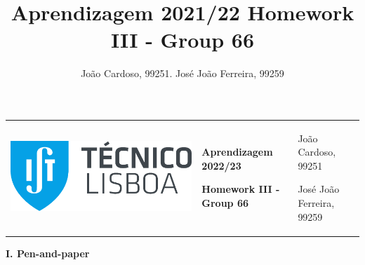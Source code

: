 \documentclass[11pt,a4paper]{article}
\title{Aprendizagem 2021/22 Homework III - Group 66}
\author{João Cardoso, 99251. José João Ferreira, 99259}
\begin{document}
\color{darkgray}
\hspace{-8.25mm}
\renewcommand\tabularxcolumn[1]{m{#1}}
\begin{tabularx}{1.09\textwidth} {>{\raggedright\arraybackslash}X >{\centering\arraybackslash}X >{\raggedleft\arraybackslash}X}
  \includegraphics[scale=0.2]{tecnico.pdf} &
  \textbf{Aprendizagem 2022/23} \par \textbf{Homework III - Group 66} &
  João Cardoso, 99251 \par José João Ferreira, 99259
\end{tabularx}
\renewcommand\tabularxcolumn[1]{p{#1}}
\color{black}

\begin{center}
\textbf{I. Pen-and-paper}
\end{center}
\end{document}
